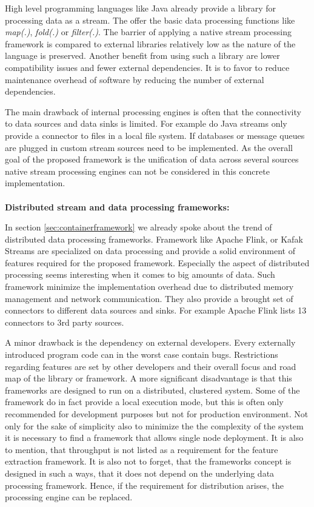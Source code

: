 \noindent High level programming languages like Java already provide a library for processing data as a stream\cite{urma_2017}. The offer the basic data processing functions like \textit{map(.)}, \textit{fold(.)} or \textit{filter(.)}. The barrier of applying a native stream processing framework is compared to external libraries relatively low as the nature of the language is preserved. Another benefit from using such a library are lower compatibility issues and fewer external dependencies. It is to favor to reduce maintenance overhead of software by reducing the number of external dependencies. 

The main drawback of internal processing engines is often that the connectivity to data sources and data sinks is limited. For example do Java streams only provide a connector to files in a local file system. If databases or message queues are plugged in custom stream sources need to be implemented. As the overall goal of the proposed framework is the unification of data across several sources native stream processing engines can not be considered in this concrete implementation.
\\\\
\textbf{Distributed stream and data processing frameworks:}

\noindent In section \ref{sec:containerframework} we already spoke about the trend of distributed data processing frameworks. Framework like Apache Flink, or Kafak Streams are specialized on data processing and provide a solid environment of features required for the proposed framework. Especially the aspect of distributed processing seems interesting when it comes to big amounts of data. Such framework minimize the implementation overhead due to distributed memory management and network communication. They also provide a brought set of connectors to different data sources and sinks. For example Apache Flink lists 13 connectors to 3rd party sources\cite{flink_streaming_2017}. 

A minor drawback is the dependency on external developers. Every externally introduced program code can in the worst case contain bugs. Restrictions regarding features are set by other developers and their overall focus and road map of the library or framework. A more significant disadvantage is that this frameworks are designed to run on a distributed, clustered system. Some of the framework do in fact provide a local execution mode, but this is often only recommended for development purposes but not for production environment. Not only for the sake of simplicity also to minimize the the complexity of the system it is necessary to find a framework that allows single node deployment. It is also to mention, that throughput is not listed as a requirement for the feature extraction framework. It is also not to forget, that the frameworks concept is designed in such a ways, that it does not depend on the underlying data processing framework. Hence, if the requirement for distribution arises, the processing engine can be replaced.
\\\\

